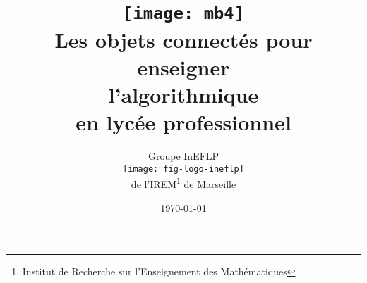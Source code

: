 \documentclass[10pt]{article}
\title{%
    \Huge
    \texttt{[image: mb4]}\\[2cm]
    Les objets connectés pour enseigner\\
    l'algorithmique\\
    en lycée professionnel}
\author{%
    Groupe InEFLP\\
    \texttt{[image: fig-logo-ineflp]}\\
    de l'IREM\footnote{Institut de Recherche sur l'Enseignement des Mathématiques} de Marseille
    }
\date{\today}
\begin{document}
\newpage\nopagecolor


\newpage






\end{document}
